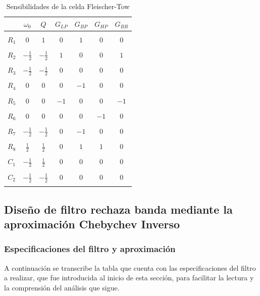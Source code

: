 \begin{table}[H]
	\centering
	\begin{tabular}{c c c c c c c}
		& $\omega_0$ & $Q$ &$G_{LP}$ & $G_{BP}$& $G_{HP}$& $G_{BR}$\\
		\hline \\ 
		$R_1$ & $0$ & $1$ & $0$ & $1$ & $0$ & $0$\\ \\
		$R_2$ & $-\frac{1}{2}$ & $-\frac{1}{2}$ & $1$ & $0$ & $0$ & $1$\\ \\
		$R_3$ & $-\frac{1}{2}$ & $-\frac{1}{2}$ & $0$ & $0$ & $0$ & $0$\\ \\
		$R_4$ & $0$ & $0$ & $0$ & $-1$ & $0$ & $0$\\ \\
		$R_5$ & $0$ & $0$ & $-1$ & $0$ & $0$ & $-1$\\ \\
		$R_6$ & $0$ & $0$ & $0$ & $0$ & $-1$ & $0$\\ \\
		$R_7$ & $-\frac{1}{2}$ & $-\frac{1}{2}$ & $0$ & $-1$ & $0$ & $0$\\ \\
		$R_8$ & $\frac{1}{2}$ & $\frac{1}{2}$ & $0$ & $1$ & $1$ & $0$\\ \\
		$C_1$ & $-\frac{1}{2}$ & $\frac{1}{2}$ & $0$ & $0$ & $0$ & $0$\\ \\
		$C_2$ & $-\frac{1}{2}$ & $-\frac{1}{2}$ & $0$ & $0$ & $0$ & $0$\\ \\
		\hline
	\end{tabular}
	\caption{Sensibilidades de la celda Fleischer-Tow}
	\label{sens_am}
\end{table}

\subsection{Dise\~no de filtro rechaza banda mediante la aproximaci\'on  Chebychev Inverso}

\subsubsection{Especificaciones del filtro y aproximaci\'on}
A continuaci\'on se transcribe la tabla que cuenta con las especificaciones del filtro a realizar, que fue introducida al inicio de esta secci\'on, para facilitar la lectura y la comprensi\'on del an\'alisis que sigue.

